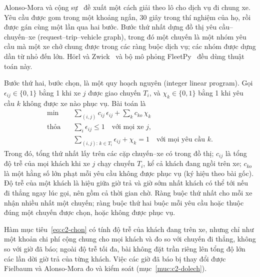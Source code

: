 Alonso-Mora và cộng sự~\cite{alonsomora2017} đề xuất một cách giải theo lô cho dịch vụ đi chung xe. Yêu cầu được gom
trong một khoảng ngắn, 30 giây trong thí nghiệm của họ, rồi được gán cùng một lần qua hai bước. Bước thứ nhất dựng
đồ thị yêu cầu--chuyến--xe (request--trip--vehicle graph), trong đó một chuyến là một nhóm yêu cầu mà một xe chở chung
được trong các ràng buộc dịch vụ; các nhóm được dựng dần từ nhỏ đến lớn. Hörl và Zwick~\cite{horl2022} và bộ mô
phỏng FleetPy~\cite{engelhardt2026} đều dùng thuật toán này.

Bước thứ hai, bước chọn, là một quy hoạch nguyên (integer linear program). Gọi $\epsilon_{ij} \in \{0, 1\}$ bằng 1
khi xe $j$ được giao chuyến $T_i$, và $\chi_k \in \{0, 1\}$ bằng 1 khi yêu cầu $k$ không được xe nào phục vụ. Bài
toán là
\begin{equation}
\begin{aligned}
\min\quad & \sum_{(i,j)} c_{ij}\,\epsilon_{ij} + \sum_{k} c_{ko}\,\chi_k\\
\text{thỏa}\quad & \sum_{i} \epsilon_{ij} \le 1 \quad \text{với mọi xe } j,\\
& \sum_{(i,j):\, k \in T_i} \epsilon_{ij} + \chi_k = 1 \quad \text{với mọi yêu cầu } k .
\end{aligned}
\label{eq:c2-chon}
\end{equation}
Trong đó, tổng thứ nhất lấy trên các cặp chuyến--xe có trong đồ thị; $c_{ij}$ là tổng độ trễ của mọi khách khi xe $j$
chạy chuyến $T_i$, kể cả khách đang ngồi trên xe; $c_{ko}$ là một hằng số lớn phạt mỗi yêu cầu không được phục vụ (ký
hiệu theo bài gốc). Độ trễ của một khách là hiệu giữa giờ trả và giờ sớm nhất khách có thể tới nếu đi thẳng ngay lúc
gọi, nên gồm cả thời gian chờ. Ràng buộc thứ nhất cho mỗi xe nhận nhiều nhất một chuyến; ràng buộc thứ hai buộc mỗi
yêu cầu hoặc thuộc đúng một chuyến được chọn, hoặc không được phục vụ.

Hàm mục tiêu~\eqref{eq:c2-chon} có tính độ trễ của khách đang trên xe, nhưng chỉ như một khoản chi phí cộng chung cho
mọi khách và đo so với chuyến đi thẳng, không so với giờ đã báo; ngoài độ trễ tối đa, bài không đặt trần riêng lên
tổng độ lớn các lần dời giờ trả của từng khách. Việc các giờ đã báo bị thay đổi được Fielbaum và Alonso-Mora đo và
kiểm soát (mục~\ref{muc:c2-dolech}).

